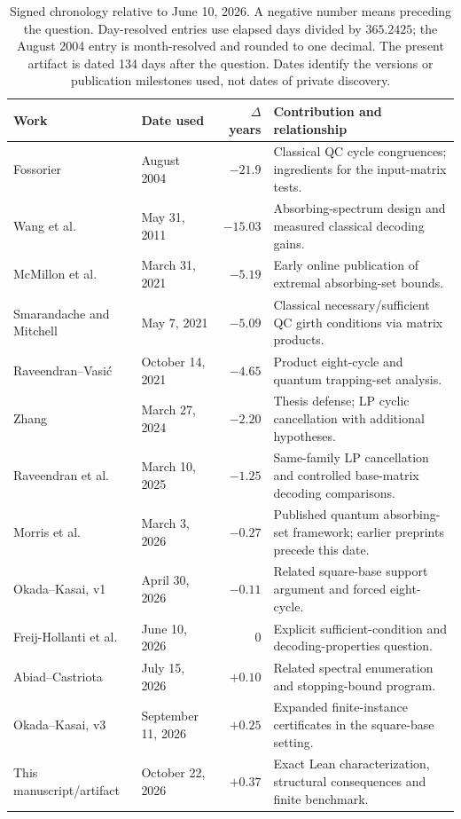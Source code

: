 \documentclass[11pt]{article}
\theoremstyle{definition}
\theoremstyle{remark}
\begin{document}
\begin{table}[p]
\centering\small
\begin{tabular}{P{.20\linewidth}P{.18\linewidth}rP{.37\linewidth}}
\toprule
Work & Date used & $\Delta$ years & Contribution and relationship \\
\midrule
Fossorier~\cite{Fossorier2004} & August 2004 & $-21.9$ & Classical QC cycle congruences; ingredients for the input-matrix tests. \\
Wang et al.~\cite{WDZW2011} & May 31, 2011 & $-15.03$ & Absorbing-spectrum design and measured classical decoding gains. \\
McMillon et al.~\cite{MBK2023} & March 31, 2021 & $-5.19$ & Early online publication of extremal absorbing-set bounds. \\
Smarandache and Mitchell~\cite{SM2021} & May 7, 2021 & $-5.09$ & Classical necessary/sufficient QC girth conditions via matrix products. \\
Raveendran--Vasi\'c~\cite{RV2021} & October 14, 2021 & $-4.65$ & Product eight-cycle and quantum trapping-set analysis. \\
Zhang~\cite{Zhang2024} & March 27, 2024 & $-2.20$ & Thesis defense; LP cyclic cancellation with additional hypotheses. \\
Raveendran et al.~\cite{RDV2025} & March 10, 2025 & $-1.25$ & Same-family LP cancellation and controlled base-matrix decoding comparisons. \\
Morris et al.~\cite{MPK2026} & March 3, 2026 & $-0.27$ & Published quantum absorbing-set framework; earlier preprints precede this date. \\
Okada--Kasai, v1~\cite{OK2026} & April 30, 2026 & $-0.11$ & Related square-base support argument and forced eight-cycle. \\
Freij-Hollanti et al.~\cite{FHM2026} & June 10, 2026 & $0$ & Explicit sufficient-condition and decoding-properties question. \\
Abiad--Castriota~\cite{AC2026} & July 15, 2026 & $+0.10$ & Related spectral enumeration and stopping-bound program. \\
Okada--Kasai, v3~\cite{OK2026} & September 11, 2026 & $+0.25$ & Expanded finite-instance certificates in the square-base setting. \\
This manuscript/artifact & October 22, 2026 & $+0.37$ & Exact Lean characterization, structural consequences and finite benchmark. \\
\bottomrule
\end{tabular}
\caption{Signed chronology relative to June 10, 2026. A negative number
means preceding the question. Day-resolved entries use elapsed days divided
by $365.2425$; the August 2004 entry is month-resolved and rounded to one
decimal. The present artifact is dated 134 days after the question.
Dates identify the versions or publication milestones used, not dates of
private discovery.}
\label{tab:history}
\end{table}
\end{document}
